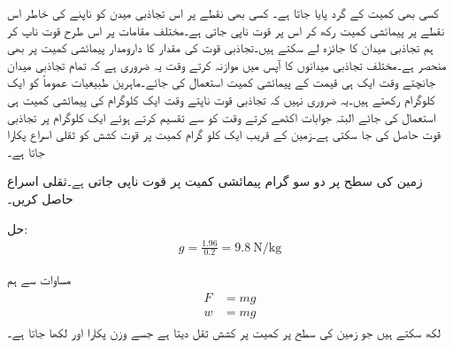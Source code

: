 کسی بھی کمیت  کے گرد   پایا جاتا ہے۔ کسی بھی نقطے پر  اس تجاذبی میدن کو ناپنے کی خاطر اس نقطے پر پیمائشی کمیت  رکھ کر اس پر قوت ناپی جاتی ہے۔مختلف مقامات پر اس طرح قوت ناپ کر ہم تجاذبی میدان کا جائزہ لے سکتے ہیں۔تجاذبی قوت کی مقدار کا دارومدار پیمائشی کمیت   پر بھی منحصر ہے۔مختلف تجاذبی میدانوں کا آپس میں موازنہ کرتے وقت یہ ضروری ہے کہ تمام تجاذبی میدان جانچتے وقت ایک ہی قیمت کے پیمائشی کمیت استعمال کی جائے۔ماہرین طبیعیات عموماً  کو ایک کلوگرام  رکھتے ہیں۔یہ ضروری نہیں کہ تجاذبی قوت ناپتے وقت ایک کلوگرام کی پیمائشی کمیت ہی استعمال کی جائے البتہ جوابات اکٹھے کرتے وقت  کو  سے تقسیم کرتے ہوئے ایک کلوگرام پر تجاذبی قوت حاصل کی جا سکتی ہے۔زمین کے قریب ایک کلو گرام کمیت پر قوت کشش کو ثقلی اسراع  پکارا جاتا ہے۔

زمین کی سطح پر دو سو گرام پیمائشی کمیت پر  قوت ناپی جاتی ہے۔ثقلی اسراع حاصل کریں۔

حل:
\begin{align}
g=\frac{1.96}{0.2}=\SI{9.8}{\newton \per \kilogram}
\end{align}   

مساوات  سے ہم
\begin{gather}
\begin{aligned}
F&=m g\\
w&=m g
\end{aligned}
\end{gather}
لکھ سکتے ہیں جو زمین کی  سطح پر کمیت  پر کشش ثقل  دیتا ہے جسے  وزن پکارا اور   لکھا جاتا ہے۔
  
